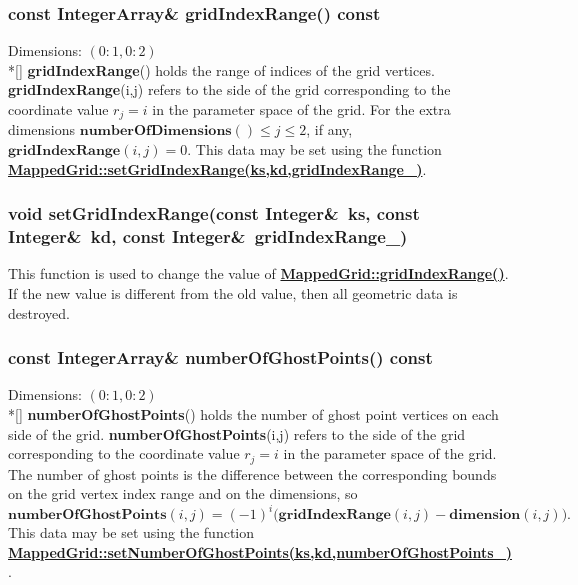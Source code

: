 \documentclass{article}
\begin{document}
  \subsubsection{const IntegerArray\& gridIndexRange() const}
  \label{MappedGrid::gridIndexRange()}
    Dimensions: $(0\colon1,0\colon2)$ \\*[\parskip]
    \textbf{gridIndexRange}() holds the range of indices of the grid vertices.
    \textbf{gridIndexRange}(i,j) refers to the side of the grid corresponding to
    the coordinate value $r_j = i$ in the parameter space of the grid.
    For the extra dimensions $\textbf{numberOfDimensions}()\le j \le 2$, if any, $\textbf{gridIndexRange}(i,j)=0$.
    This data may be set using the function
    {\bf{}\hyperref{setGridIndexRange(ks,kd,gridIndexRange\_)}{setGridIndexRange(ks,kd,gridIndexRange\_) \rm(\S}{)}{MappedGrid::setGridIndexRange(ks,kd,gridIndexRange_)}}.

  \subsubsection{void setGridIndexRange(const Integer\&~ks, const Integer\&~kd, const Integer\&~gridIndexRange\_)}
  \label{MappedGrid::setGridIndexRange(ks,kd,gridIndexRange_)}
    This function is used to change the value of
    {\bf{}\hyperref{gridIndexRange()}{gridIndexRange() \rm(\S}{)}{MappedGrid::gridIndexRange()}}.
    If the new value is different from the old value, then all geometric data is destroyed.

  \subsubsection{const IntegerArray\& numberOfGhostPoints() const}
  \label{MappedGrid::numberOfGhostPoints()}
    Dimensions: $(0\colon1,0\colon2)$ \\*[\parskip]
    \textbf{numberOfGhostPoints}() holds the number of ghost point vertices on
    each side of the grid.  \textbf{numberOfGhostPoints}(i,j) refers to the
    side of the grid corresponding to the coordinate value $r_j = i$ in the
    parameter space of the grid.  The number of ghost points is the difference
    between the corresponding bounds on the grid vertex index range and on the
    dimensions, so
    \[ \textbf{numberOfGhostPoints}(i,j) = (-1)^i
       \big(\textbf{gridIndexRange}(i,j) - \textbf{dimension}(i,j)\big).
    \]
    This data may be set using the function
    {\bf{}\hyperref{setNumberOfGhostPoints(ks,kd,numberOfGhostPoints\_)}{setNumberOfGhostPoints(ks,kd,numberOfGhostPoints\_) \rm(\S}{)}{MappedGrid::setNumberOfGhostPoints(ks,kd,numberOfGhostPoints_)}}.
\end{document}
